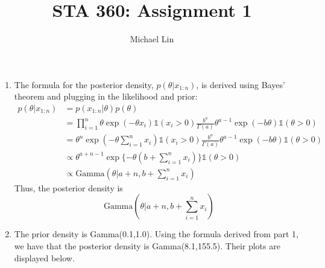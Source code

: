 \documentclass{article}
\title{STA 360: Assignment 1}
\author{Michael Lin}
\begin{document}
\maketitle

\begin{enumerate}
\item The formula for the posterior density, $p(\theta|x_{1:n})$, is derived using Bayes' theorem and plugging in the likelihood and prior:
\begin{align*}
p(\theta|x_{1:n})&=p(x_{1:n}|\theta)p(\theta) \\
&=\prod\limits_{i=1}^{n}\theta \exp(-\theta x_i) \mathds{1}(x_i>0)\frac{b^a}{\Gamma(a)}\theta^{a-1}\exp(-b\theta)\mathds{1}(\theta>0) \\
&=\theta^n\exp(-\theta\sum\limits_{i=1}^{n}x_i) \mathds{1}(x_i>0)\frac{b^a}{\Gamma(a)}\theta^{a-1}\exp(-b\theta)\mathds{1}(\theta>0) \\
&\propto \theta^{a+n-1}\exp\{-\theta(b+\sum\limits_{i=1}^{n}x_i)\}\mathds{1}(\theta>0) \\
&\propto \mathrm{Gamma}(\theta|a+n, b+\sum\limits_{i=1}^{n}x_i)
\end{align*}
Thus, the posterior density is $$ \mathrm{Gamma}(\theta|a+n, b+\sum\limits_{i=1}^{n}x_i) $$

\item The prior density is Gamma(0.1,1.0). Using the formula derived from part 1, we have that the posterior density is Gamma(8.1,155.5). Their plots are displayed below.


\end{enumerate}
\end{document}
